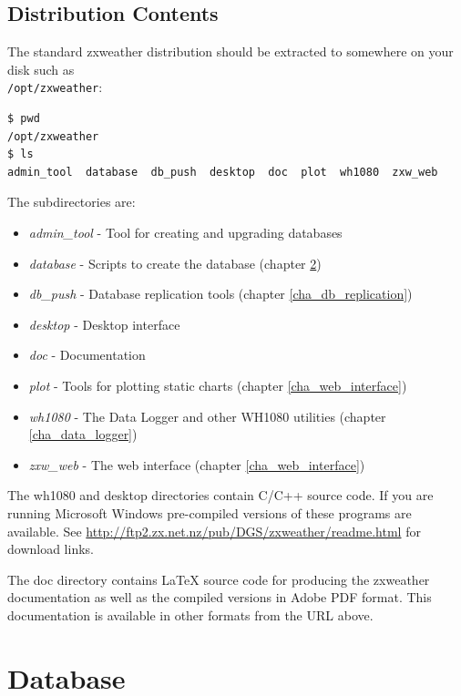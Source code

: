 \documentclass[a4paper,10pt,draft]{book}
\begin{document}
\section{Distribution Contents}
The standard zxweather distribution should be extracted to somewhere on your disk such as \\ \verb|/opt/zxweather|:

\begin{verbatim}
$ pwd
/opt/zxweather
$ ls
admin_tool  database  db_push  desktop  doc  plot  wh1080  zxw_web
\end{verbatim}

The subdirectories are:

\begin{itemize}
\item \emph{admin\_tool} - Tool for creating and upgrading databases
\item \emph{database} - Scripts to create the database (chapter \ref{cha_database})
\item \emph{db\_push} - Database replication tools (chapter \ref{cha_db_replication})
\item \emph{desktop}  - Desktop interface
\item \emph{doc} - Documentation
\item \emph{plot} - Tools for plotting static charts (chapter \ref{cha_web_interface})
\item \emph{wh1080} - The Data Logger and other WH1080 utilities (chapter \ref{cha_data_logger})
\item \emph{zxw\_web} - The web interface (chapter \ref{cha_web_interface})
\end{itemize}

The wh1080 and desktop directories contain C/C++ source code. If you are running Microsoft Windows pre-compiled versions of these programs are available. See \url{http://ftp2.zx.net.nz/pub/DGS/zxweather/readme.html} for download links.

The doc directory contains \LaTeX{} source code for producing the zxweather documentation as well as the compiled versions in Adobe PDF format. This documentation is available in other formats from the URL above.

\chapter{Database}
\label{cha_database}
\end{document}
